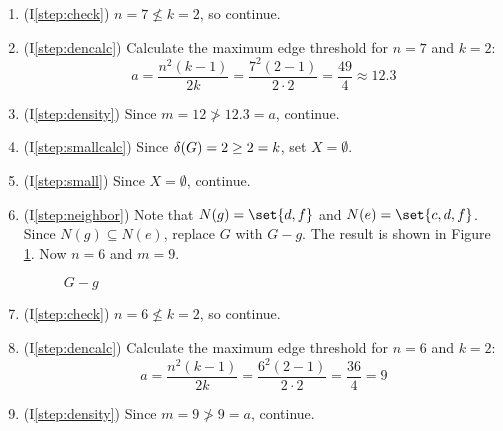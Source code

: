 \begin{enumerate}
\item (I\ref{step:check}) \(n=7\nleq k=2\), so continue.

\item (I\ref{step:dencalc}) Calculate the maximum edge threshold for \(n=7\) and \(k=2\):
  \[a=\frac{n^2(k-1)}{2k}=\frac{7^2(2-1)}{2\cdot2}=\frac{49}{4}\approx12.3\]

\item (I\ref{step:density}) Since \(m=12\ngtr12.3=a\), continue.

\item (I\ref{step:smallcalc}) Since \(\delta(G)=2\ge2=k\), set \(X=\emptyset\).

\item (I\ref{step:small}) Since \(X=\emptyset\), continue.

\item (I\ref{step:neighbor}) Note that \(N(g)=\set{d,f}\) and \(N(e)=\set{c,d,f}\).  Since \(N(g)\subseteq N(e)\),
  replace \(G\) with \(G-g\).  The result is shown in Figure \ref{fig:removeg}.  Now \(n=6\) and \(m=9\).

  \begin{figure}[h]
    \label{fig:removeg}
    \begin{center}
    \end{center}
    \caption{\(G-g\)}
  \end{figure}

\item (I\ref{step:check}) \(n=6\nleq k=2\), so continue.

\item (I\ref{step:dencalc}) Calculate the maximum edge threshold for \(n=6\) and \(k=2\):
  \[a=\frac{n^2(k-1)}{2k}=\frac{6^2(2-1)}{2\cdot2}=\frac{36}{4}=9\]

\item (I\ref{step:density}) Since \(m=9\ngtr9=a\), continue.


\end{enumerate}

